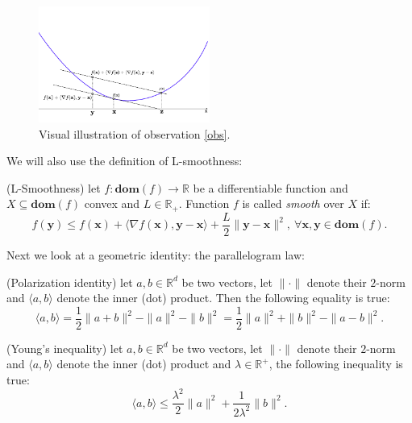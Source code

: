 \begin{figure}[h!]
    \centering
    \includegraphics[width=0.5\textwidth]{figures/observation.pdf}
    \caption{Visual illustration of observation \ref{obs}.}
\end{figure}


\noindent
We will also use the definition of L-smoothness:
\begin{property}
    (L-Smoothness) let $f:\bm{dom}(f) \rightarrow \mathbb{R}$ be a differentiable function and $X \subseteq \bm{dom}(f)$ convex and $L\in\mathbb{R}_+$. Function $f$ is called \textit{smooth} over $X$ if:
    \[  f(\bm{y}) \leq f(\bm{x}) +  \langle \nabla f(\bm{x}) , \bm{y}-\bm{x} \rangle +  \frac{L}{2} \|\bm{y}-\bm{x} \|^2 ,~  \forall \bm{x},\bm{y} \in \bm{dom}(f). \]
    \label{lsmooth}
\end{property}

\noindent
Next we look at a geometric identity: the parallelogram law:

\begin{property}
    (Polarization identity) let $a,b \in \mathbb{R}^d$ be two vectors, let $\|\cdot\|$ denote their $2$-norm and $\langle a , b \rangle$ denote the inner (dot) product. Then the following equality is true:
    \[  \langle a , b \rangle =  \frac{1}{2}\| a+b\|^2 - \|a\|^2- \|b\|^2 = \frac{1}{2}  \|a\|^2 + \|b\|^2 - \| a-b\|^2.  \]
    \label{polID}
\end{property}

\begin{property}
    (Young's inequality) let $a,b \in \mathbb{R}^d$ be two vectors, let $\|\cdot\|$ denote their $2$-norm and $\langle a , b \rangle$ denote the inner (dot) product and $\lambda \in \mathbb{R}^+$, the following inequality is true:
    \[  \langle a , b \rangle \leq \frac{\lambda^2}{2} \| a \|^2 + \frac{1}{2 \lambda^2} \| b \|^2. \]
    \label{young}
\end{property}

